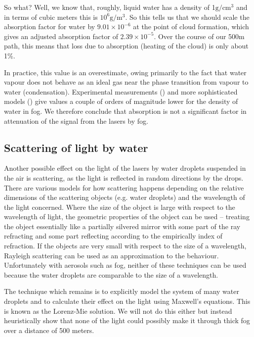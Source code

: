So what? Well, we know that, roughly, liquid water has a density of
1$\text{g}/\text{cm}^3$ and in terms of cubic meters this is
$10^6\text{g}/\text{m}^3$. So this tells us that we should scale the
absorption factor for water by $9.01\times 10^{-6}$ at the point of
cloud formation, which gives an adjusted absorption factor of
$2.39\times 10^{-5}$. Over the course of our 500m path, this means
that loss due to absorption (heating of the cloud) is only about
1\%.

In practice, this value is an overestimate, owing primarily to the
fact that water vapour does not behave as an ideal gas near the phase
transition from vapour to water (condensation). Experimental
measurements (\cite{whiteman_cloud_1999}) and more sophisticated
models (\cite{tampieri_size_1976,hess_optical_1998}) give values a
couple of orders of magnitude lower for the density of water in
fog. We therefore conclude that absorption is not a significant factor
in attenuation of the signal from the lasers by fog.

\subsection{Scattering of light by water}
\label{sec:scattering}
Another possible effect on the light of the lasers by water droplets
suspended in the air is scattering, as the light is reflected in
random directions by the drops. There are various models for how
scattering happens depending on the relative dimensions of the
scattering objects (e.g. water droplets) and the wavelength of the
light concerned. Where the size of the object is large with respect to
the wavelength of light, the geometric properties of the object can be
used -- treating the object essentially like a partially silvered
mirror with some part of the ray refracting and some part reflecting
according to the empirically index of refraction. If the objects are
very small with respect to the size of a wavelength, Rayleigh
scattering can be used as an approximation to the
behaviour. Unfortunately with aerosols such as fog, neither of these
techniques can be used because the water droplets are comparable to
the size of a wavelength.

The technique which remains is to explicitly model the system of many
water droplets and to calculate their effect on the light using
Maxwell's equations. This is known as the Lorenz-Mie solution. We will
not do this either but instead heuristically show that none of the
light could possibly make it through thick fog over a distance of 500
meters.

